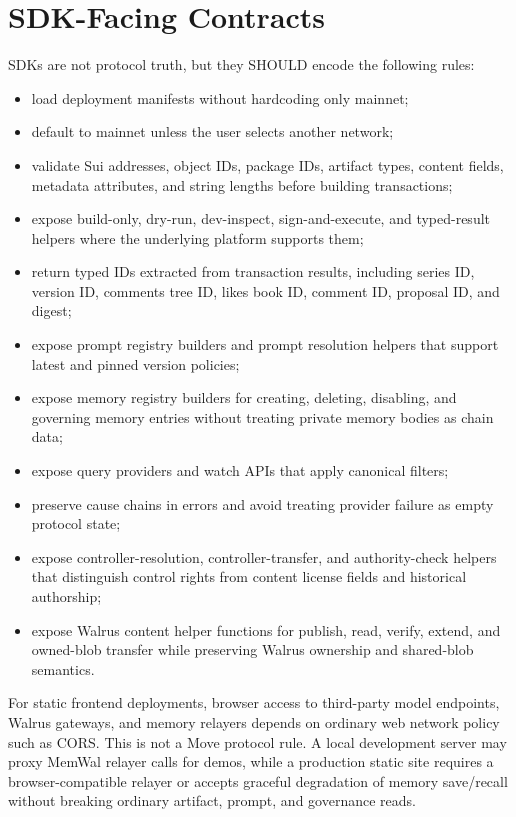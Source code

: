 \documentclass[11pt]{article}
\begin{document}
\section{SDK-Facing Contracts}

SDKs are not protocol truth, but they SHOULD encode the following rules:

\begin{itemize}[leftmargin=*]
  \item load deployment manifests without hardcoding only mainnet;
  \item default to mainnet unless the user selects another network;
  \item validate Sui addresses, object IDs, package IDs, artifact types, content fields, metadata attributes, and string lengths before building transactions;
  \item expose build-only, dry-run, dev-inspect, sign-and-execute, and typed-result helpers where the underlying platform supports them;
  \item return typed IDs extracted from transaction results, including series ID, version ID, comments tree ID, likes book ID, comment ID, proposal ID, and digest;
  \item expose prompt registry builders and prompt resolution helpers that support latest and pinned version policies;
  \item expose memory registry builders for creating, deleting, disabling, and governing memory entries without treating private memory bodies as chain data;
  \item expose query providers and watch APIs that apply canonical filters;
  \item preserve cause chains in errors and avoid treating provider failure as empty protocol state;
  \item expose controller-resolution, controller-transfer, and authority-check helpers that distinguish control rights from content license fields and historical authorship;
  \item expose Walrus content helper functions for publish, read, verify, extend, and owned-blob transfer while preserving Walrus ownership and shared-blob semantics.
\end{itemize}

For static frontend deployments, browser access to third-party model endpoints,
Walrus gateways, and memory relayers depends on ordinary web network policy such
as CORS. This is not a Move protocol rule. A local development server may proxy
MemWal relayer calls for demos, while a production static site requires a
browser-compatible relayer or accepts graceful degradation of memory save/recall
without breaking ordinary artifact, prompt, and governance reads.
\end{document}
